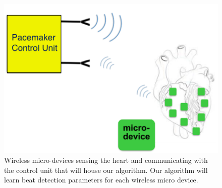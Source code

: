 \documentclass[conference]{IEEEtran}
\begin{document}
\begin{figure}[h]
	\centering
	\includegraphics[width=.8\columnwidth]{wireless.png}
	\caption{Wireless micro-devices sensing the heart and communicating with the control unit that will house our algorithm.  Our algorithm will learn beat detection parameters for each wireless micro device.}
	\label{fig:wireless}
\end{figure}
\end{document}
